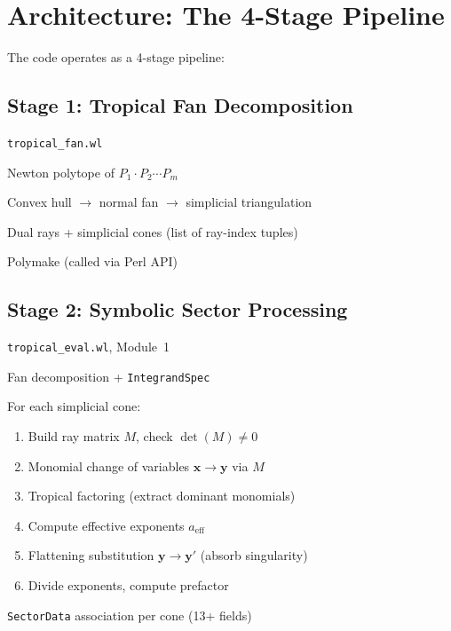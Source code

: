 \documentclass[11pt,a4paper]{article}
\begin{document}
\section{Architecture: The 4-Stage Pipeline}

The code operates as a 4-stage pipeline:

\subsection{Stage 1: Tropical Fan Decomposition}
\begin{description}[style=nextline]
  \item[Source:] \texttt{tropical\_fan.wl}
  \item[Input:] Newton polytope of $P_1 \cdot P_2 \cdots P_m$
  \item[Process:] Convex hull $\to$ normal fan $\to$ simplicial triangulation
  \item[Output:] Dual rays + simplicial cones (list of ray-index tuples)
  \item[External Tool:] Polymake (called via Perl API)
\end{description}

\subsection{Stage 2: Symbolic Sector Processing}
\begin{description}[style=nextline]
  \item[Source:] \texttt{tropical\_eval.wl}, Module~1
  \item[Input:] Fan decomposition + \texttt{IntegrandSpec}
  \item[Process:] For each simplicial cone:
    \begin{enumerate}[label=(\alph*)]
      \item Build ray matrix $M$, check $\det(M) \neq 0$
      \item Monomial change of variables $\mathbf{x} \to \mathbf{y}$ via $M$
      \item Tropical factoring (extract dominant monomials)
      \item Compute effective exponents $a_{\mathrm{eff}}$
      \item Flattening substitution $\mathbf{y} \to \mathbf{y}'$ (absorb singularity)
      \item Divide exponents, compute prefactor
    \end{enumerate}
  \item[Output:] \texttt{SectorData} association per cone (13+ fields)
\end{description}
\end{document}
